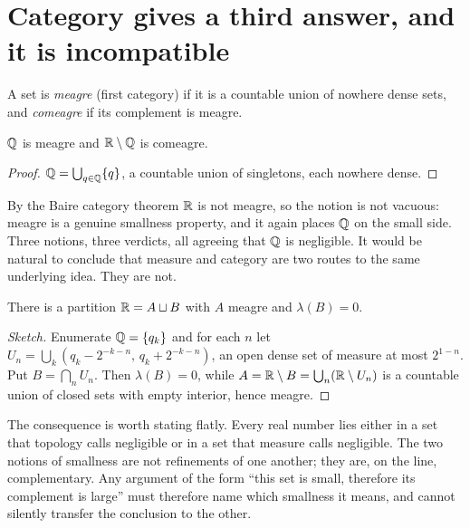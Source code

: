\documentclass{essay}
\newcommand{\Irr}{\R \setminus \Q}
\begin{document}
\section{Category gives a third answer, and it is incompatible}

\begin{definition}
  A set is \emph{meagre} (first category) if it is a countable union of
  nowhere dense sets, and \emph{comeagre} if its complement is meagre.
\end{definition}

\begin{proposition}
  \(\mathbb{Q}\) is meagre and \(\Irr\) is comeagre.
\end{proposition}

\begin{proof}
  \(\mathbb{Q} = \bigcup_{q \in \mathbb{Q}} \{q\}\), a countable union of singletons, each
  nowhere dense.
\end{proof}

By the Baire category theorem \(\mathbb{R}\) is not meagre, so the notion is not
vacuous: meagre is a genuine smallness property, and it again places
\(\mathbb{Q}\) on the small side. Three notions, three verdicts, all agreeing
that \(\mathbb{Q}\) is negligible. It would be natural to conclude that measure
and category are two routes to the same underlying idea. They are not.

\begin{theorem}
  There is a partition \(\mathbb{R} = A \sqcup B\) with \(A\) meagre and \(\lambda(B)
  = 0\).
\end{theorem}

\begin{proof}[Sketch]
  Enumerate \(\mathbb{Q} = \{q_{k}\}\) and for each \(n\) let \(U_{n} = \bigcup_{k} (q_{k} -
  2^{-k-n},\, q_{k} + 2^{-k-n})\), an open dense set of measure at most
  \(2^{1-n}\). Put \(B = \bigcap_{n} U_{n}\). Then \(\lambda(B) = 0\), while
  \(A = \mathbb{R} \setminus B = \bigcup_{n} (\mathbb{R} \setminus U_{n})\) is a countable
  union of closed sets with empty interior, hence meagre.
\end{proof}

The consequence is worth stating flatly. Every real number lies either
in a set that topology calls negligible or in a set that measure calls
negligible. The two notions of smallness are not refinements of one
another; they are, on the line, complementary. Any argument of the form
``this set is small, therefore its complement is large'' must therefore
name which smallness it means, and cannot silently transfer the
conclusion to the other.
\end{document}
